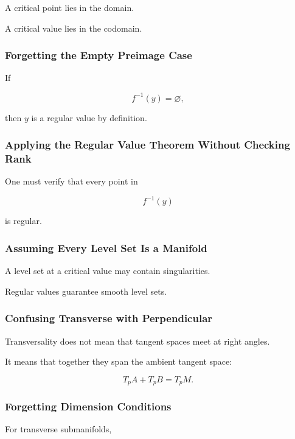 A critical point lies in the domain.

A critical value lies in the codomain.

\subsubsection{Forgetting the Empty Preimage Case}

If

\[
f^{-1}(y)=\varnothing,
\]

then \(y\) is a regular value by definition.

\subsubsection{Applying the Regular Value Theorem Without Checking Rank}

One must verify that every point in

\[
f^{-1}(y)
\]

is regular.

\subsubsection{Assuming Every Level Set Is a Manifold}

A level set at a critical value may contain singularities.

Regular values guarantee smooth level sets.

\subsubsection{Confusing Transverse with Perpendicular}

Transversality does not mean that tangent spaces meet at right angles.

It means that together they span the ambient tangent space:

\[
T_pA+T_pB=T_pM.
\]

\subsubsection{Forgetting Dimension Conditions}

For transverse submanifolds,

